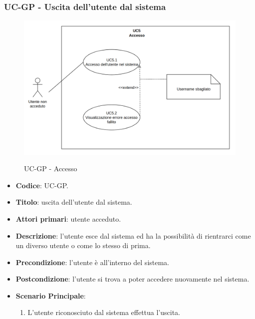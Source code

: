 \subsubsection{UC\theuccount-GP - Uscita dell'utente dal sistema}
		\begin{figure}[H]
			\centering
				\includegraphics[width=\columnwidth]{img/UC5.png}\\
			\caption{UC\theuccount-GP - Accesso}
		\end{figure}
	\begin{itemize}
		\item \textbf{Codice}: UC\theuccount-GP.
		\item \textbf{Titolo}: uscita dell'utente dal sistema.
		\item \textbf{Attori primari}: utente acceduto.
		\item \textbf{Descrizione}: l'utente esce dal sistema ed ha la possibilità di rientrarci come
		un diverso utente o come lo stesso di prima.
		\item \textbf{Precondizione}: l'utente è all'interno del sistema.
		\item \textbf{Postcondizione}: l'utente si trova a poter accedere nuovamente nel sistema.
		\item \textbf{Scenario Principale}:
		\begin{enumerate}
			\item L'utente riconosciuto dal sistema effettua l'uscita.
		\end{enumerate}
	\end{itemize}